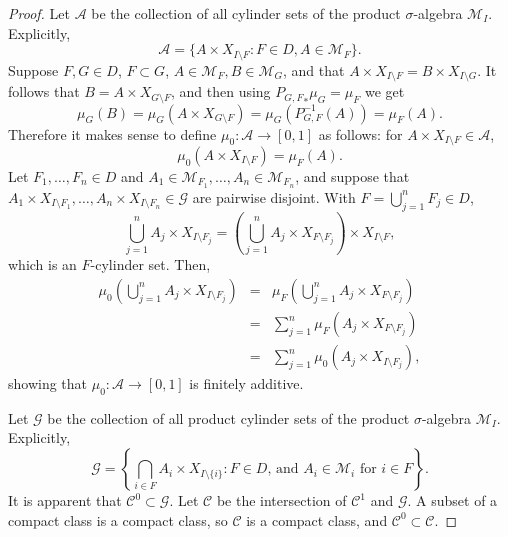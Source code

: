 \documentclass{article}
\theoremstyle{definition}
\begin{document}
\begin{proof}
Let $\mathscr{A}$ be the collection of all cylinder sets of the product $\sigma$-algebra $\mathscr{M}_I$. Explicitly,
\[
\mathscr{A} = \{A \times X_{I \setminus F}: F \in D, A \in \mathscr{M}_F\}.
\]
Suppose $F,G \in D$, $F \subset G$, $A \in \mathscr{M}_F, B \in \mathscr{M}_G$, and that
$A \times X_{I \setminus F} = B \times X_{I \setminus G}$. 
It follows that $B = A \times X_{G \setminus F}$, and then
using ${P_{G,F}}_* \mu_G = \mu_F$ we get
\[
\mu_G(B)=\mu_G(A \times X_{G \setminus F}) = \mu_G(P_{G,F}^{-1}(A)) = \mu_F(A).
\]
Therefore it makes sense to define
$\mu_0:\mathscr{A} \to [0,1]$ as follows: for $A \times X_{I \setminus F} \in \mathscr{A}$,
\[
\mu_0(A \times X_{I \setminus F}) = \mu_F(A).
\]
Let  $F_1,\ldots,F_n \in D$ and $A_1 \in \mathscr{M}_{F_1}, \ldots,A_n \in \mathscr{M}_{F_n}$, and suppose that 
$A_1 \times X_{I \setminus F_1},\ldots,A_n \times X_{I \setminus F_n} \in \mathscr{G}$ are pairwise disjoint. With $F=\bigcup_{j=1}^n F_j \in D$, 
\[
\bigcup_{j=1}^n A_j \times X_{I \setminus F_j} = \left(\bigcup_{j=1}^n A_j \times X_{F \setminus F_j} \right) \times X_{I \setminus F},
\]
which is an $F$-cylinder set. Then,
\begin{eqnarray*}
\mu_0\left(\bigcup_{j=1}^n A_j \times X_{I \setminus F_j}\right) &=& \mu_F  \left(\bigcup_{j=1}^n A_j \times X_{F \setminus F_j} \right)\\
&=&\sum_{j=1}^n \mu_F (A_j \times X_{F \setminus F_j})\\
&=&\sum_{j=1}^n \mu_0 (A_j \times X_{I \setminus F_j}),
\end{eqnarray*}
showing that $\mu_0:\mathscr{A} \to [0,1]$ is finitely additive. 

Let $\mathscr{G}$ be the collection of all product cylinder sets of the product $\sigma$-algebra $\mathscr{M}_I$. Explicitly,
\[
\mathscr{G} = \left\{\bigcap_{i \in F} A_i \times X_{I \setminus \{i\}} : \textrm{$F \in D$, and $A_i \in \mathscr{M}_i$ for 
$i \in F$}\right\}.
\]
It is apparent that $\mathscr{C}^0 \subset \mathscr{G}$. Let $\mathscr{C}$ be the intersection of $\mathscr{C}^1$ and $\mathscr{G}$. A subset of a compact
class is a compact class, so $\mathscr{C}$ is a compact class, and
$\mathscr{C}^0 \subset \mathscr{C}$. 


\end{proof}
\end{document}
